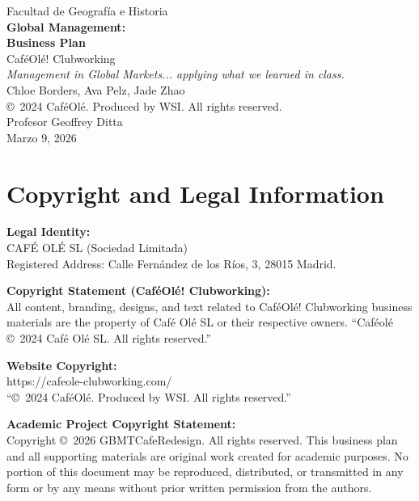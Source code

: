 \documentclass[12pt,a4paper]{article}
\begin{document}
\thispagestyle{empty}
\begin{center}
\vspace*{1.5cm}
{\large Facultad de Geograf\'ia e Historia}\\[1.5em]
{\LARGE\bfseries\color{eublue} Global Management:}\\[0.3em]
{\LARGE\bfseries\color{eublue} Business Plan}\\[1em]
{\large Caf\'eOl\'e! Clubworking}\\[0.5em]
{\normalsize\itshape Management in Global Markets... applying what we learned in class.}\\[1.5em]
{\normalsize Chloe Borders, Ava Pelz, Jade Zhao}\\[0.5em]
{\small \copyright\ 2024 Caf\'eOl\'e. Produced by WSI. All rights reserved.}\\[1em]
{\normalsize Profesor Geoffrey Ditta}\\[0.3em]
{\normalsize Marzo 9, 2026}
\end{center}
\newpage
\pagestyle{fancy}

\section*{\color{sectionblue}Copyright and Legal Information}
\small
\textbf{Legal Identity:}\\
CAF\'E OL\'E SL (Sociedad Limitada)\\
Registered Address: Calle Fern\'andez de los R\'ios, 3, 28015 Madrid.

\textbf{Copyright Statement (Caf\'eOl\'e! Clubworking):}\\
All content, branding, designs, and text related to Caf\'eOl\'e! Clubworking business materials are the property of Caf\'e Ol\'e SL or their respective owners. ``Caf\'eol\'e \copyright\ 2024 Caf\'e Ol\'e SL. All rights reserved.''

\textbf{Website Copyright:}\\
https://cafeole-clubworking.com/\\
``\copyright\ 2024 Caf\'eOl\'e. Produced by WSI. All rights reserved.''

\textbf{Academic Project Copyright Statement:}\\
Copyright \copyright\ 2026 GBMTCafeRedesign. All rights reserved. This business plan and all supporting materials are original work created for academic purposes. No portion of this document may be reproduced, distributed, or transmitted in any form or by any means without prior written permission from the authors.
\end{document}
